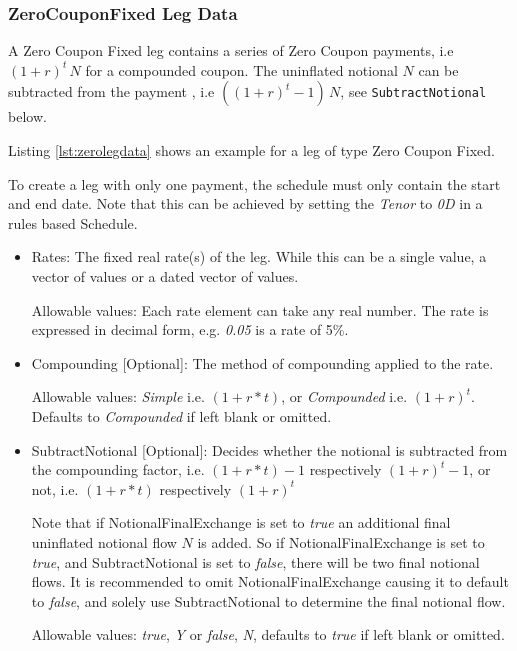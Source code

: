 \subsubsection{ZeroCouponFixed Leg Data}
\label{ss:zerolegdata}

A Zero Coupon Fixed leg contains a series of Zero Coupon payments, i.e $(1 + r)^t \,N$ for a compounded coupon. The uninflated notional $N$ can be subtracted from the payment , i.e $((1 + r)^t-1) \,N$, see \lstinline!SubtractNotional! below.

Listing \ref{lst:zerolegdata} shows an example for a leg of type Zero Coupon Fixed. 

To create a leg with only one payment, the schedule must only contain the start and end date. Note that this can be achieved by setting the \emph{Tenor} to \emph{0D} in a rules based Schedule. 

\begin{itemize}
\item Rates: The fixed real rate(s) of the leg. While this can be a single value, a vector of values or a dated vector of
  values. 
 
 Allowable values: Each rate element can take any  real number. The rate is
  expressed in decimal form, e.g. \emph{0.05} is a rate of 5\%.
\item Compounding [Optional]:  The method of compounding applied to the rate.

Allowable values: \emph{Simple} i.e. $(1 + r * t)$, or \emph{Compounded} i.e. $(1 + r)^t$. Defaults to \emph{Compounded} if left blank or omitted. 


\item SubtractNotional [Optional]:  Decides whether the notional is
  subtracted from the compounding factor,  i.e. $(1 + r * t)  - 1$
  respectively  $(1 + r)^t - 1$, or not, i.e. $(1 + r * t)$  respectively  $(1 + r)^t$

Note that if NotionalFinalExchange is set to  \emph{true} an additional final uninflated notional flow $N$ is added. So if NotionalFinalExchange is set to \emph{true}, and SubtractNotional is set to \emph{false}, there will be two final notional flows. It is recommended to omit NotionalFinalExchange causing it to default to \emph{false}, and solely use SubtractNotional to determine the final notional flow.

Allowable values: \emph{true},  \emph{Y} or \emph{false}, \emph{N}, defaults to \emph{true} if left blank or omitted. 

\end{itemize}

